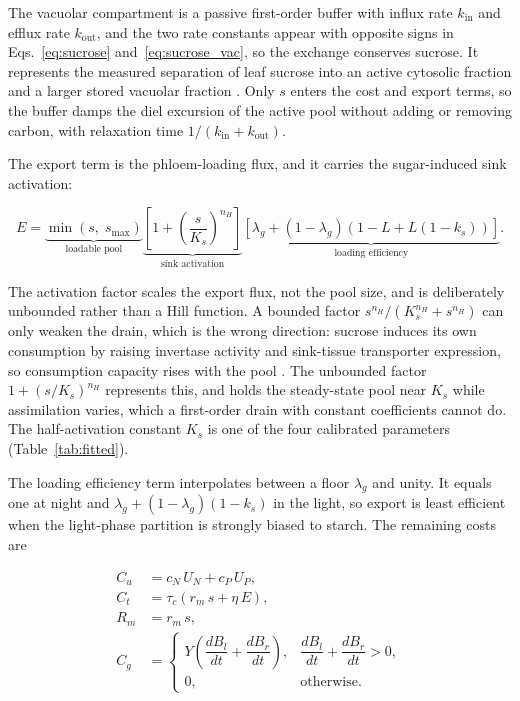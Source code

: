 The vacuolar compartment is a passive first-order buffer with influx rate
$k_{\mathrm{in}}$ and efflux rate $k_{\mathrm{out}}$, and the two rate constants
appear with opposite signs in Eqs.~\eqref{eq:sucrose} and~\eqref{eq:sucrose_vac},
so the exchange conserves sucrose. It represents the measured separation of leaf
sucrose into an active cytosolic fraction and a larger stored vacuolar fraction
\citep{Lohaus2000,Nadwodnik2008}. Only $s$ enters the cost and export terms, so
the buffer damps the diel excursion of the active pool without adding or removing
carbon, with relaxation time $1/(k_{\mathrm{in}}+k_{\mathrm{out}})$.

The export term is the phloem-loading flux, and it carries the sugar-induced
sink activation:

\begin{equation}
E =
\underbrace{\min\!\left(s,\;s_{\max}\right)}_{\text{loadable pool}}
\underbrace{\left[1 + \left(\frac{s}{K_s}\right)^{n_H}\right]}_{\text{sink activation}}
\underbrace{\left[\lambda_g + \left(1-\lambda_g\right)\left(1 - L + L\left(1-k_s\right)\right)\right]}_{\text{loading efficiency}} .
\label{eq:export}
\end{equation}

The activation factor scales the export flux, not the pool size, and is
deliberately unbounded rather than a Hill function. A bounded factor
$s^{n_H}/(K_s^{n_H}+s^{n_H})$ can only weaken the drain, which is the wrong
direction: sucrose induces its own consumption by raising invertase activity and
sink-tissue transporter expression, so consumption capacity rises with the pool
\citep{Smith2007,Stitt2012}. The unbounded factor $1+(s/K_s)^{n_H}$ represents
this, and holds the steady-state pool near $K_s$ while assimilation varies, which
a first-order drain with constant coefficients cannot do. The half-activation
constant $K_s$ is one of the four calibrated parameters (Table~\ref{tab:fitted}).

The loading efficiency term interpolates between a floor $\lambda_g$ and unity.
It equals one at night and $\lambda_g + (1-\lambda_g)(1-k_s)$ in the light, so
export is least efficient when the light-phase partition is strongly biased to
starch. The remaining costs are

\begin{align}
C_u &= c_N\,U_N + c_P\,U_P ,
\label{eq:uptake_cost}\\[3pt]
C_t &= \tau_c\left(r_m\,s + \eta\,E\right),
\label{eq:transport_cost}\\[3pt]
R_m &= r_m\,s ,
\label{eq:respiration}\\[3pt]
C_g &=
\begin{cases}
Y\left(\dfrac{dB_l}{dt} + \dfrac{dB_r}{dt}\right), &
\dfrac{dB_l}{dt} + \dfrac{dB_r}{dt} > 0, \\[10pt]
0, & \text{otherwise} .
\end{cases}
\label{eq:growth_cost}
\end{align}

